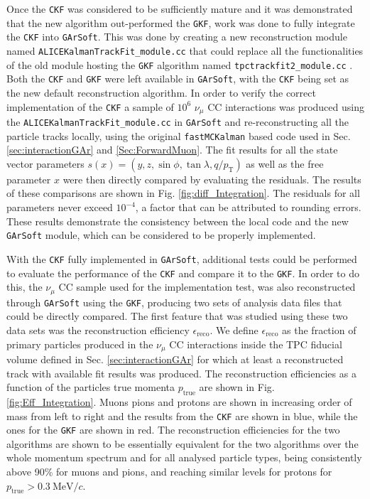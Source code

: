 Once the \texttt{CKF} was considered to be sufficiently mature and it was demonstrated that the new algorithm out-performed the \texttt{GKF}, work was done to fully integrate the \texttt{CKF} into \texttt{GArSoft}. This was done by creating a new reconstruction module named \texttt{ALICEKalmanTrackFit\_module.cc} that could replace all the functionalities of the old module hosting the \texttt{GKF} algorithm named \texttt{tpctrackfit2\_module.cc} \cite{PullRequest}. Both the \texttt{CKF} and \texttt{GKF} were left available in \texttt{GArSoft}, with the \texttt{CKF} being set as the new default reconstruction algorithm. In order to verify the correct implementation of the \texttt{CKF} a sample of $10^6$ $\nu_\mu$ CC interactions was produced using the \texttt{ALICEKalmanTrackFit\_module.cc} in \texttt{GArSoft} and re-reconstructing all the particle tracks locally, using the original \texttt{fastMCKalman} based code used in Sec. \ref{sec:interactionGAr} and \ref{Sec:ForwardMuon}. The fit results for all the state vector parameters $s(x) = \left(y,z,\sin{\phi},\tan{\lambda}, q/p_{\text{T}}\right)$ as well as the free parameter $x$ were then directly compared by evaluating the residuals. The results of these comparisons are shown in Fig. \ref{fig:diff_Integration}. The residuals for all parameters never exceed $10^{-4}$, a factor that can be attributed to rounding errors. These results demonstrate the consistency between the local code and the new \texttt{GArSoft} module, which can be considered to be properly implemented.

With the \texttt{CKF} fully implemented in \texttt{GArSoft}, additional tests could be performed to evaluate the performance of the \texttt{CKF} and compare it to the \texttt{GKF}. In order to do this, the $\nu_\mu$ CC sample used for the implementation test, was also reconstructed through \texttt{GArSoft} using the \texttt{GKF}, producing two sets of analysis data files that could be directly compared. The first feature that was studied using these two data sets was the reconstruction efficiency $\epsilon_\textrm{reco}$. We define $\epsilon_\textrm{reco}$ as the fraction of primary particles produced in the $\nu_\mu$ CC interactions inside the TPC fiducial volume defined in Sec. \ref{sec:interactionGAr} for which at least a reconstructed track with available fit results was produced. The reconstruction efficiencies as a function of the particles true momenta $p_\textrm{true}$ are shown in Fig. \ref{fig:Eff_Integration}. Muons pions and protons are shown in increasing order of mass from left to right and the results from the \texttt{CKF} are shown in blue, while the ones for the \texttt{GKF} are shown in red. The reconstruction efficiencies for the two algorithms are shown to be essentially equivalent for the two algorithms over the whole momentum spectrum and for all analysed particle types, being consistently above 90\% for muons and pions, and reaching similar levels for protons for $p_\textrm{true}>0.3\ \textrm{MeV}/c$. 

